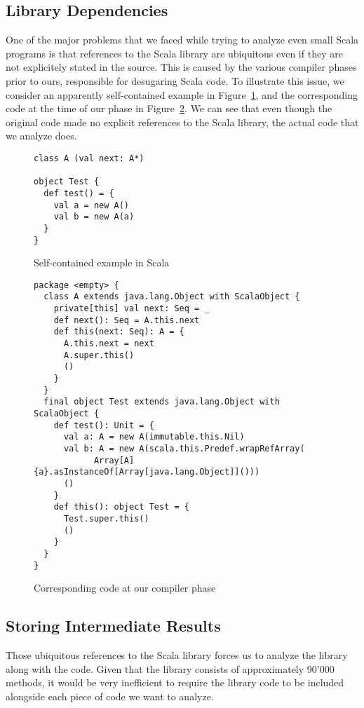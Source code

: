 \subsection{Library Dependencies}
One of the major problems that we faced while trying to analyze even small
Scala programs is that references to the Scala library are ubiquitous even if
they are not explicitely stated in the source. This is caused by the various
compiler phases prior to ours, responsible for desugaring Scala code. To
illustrate this issue, we consider an apparently self-contained example in
Figure~\ref{fig:imp:class}, and the corresponding code at the time of our phase
in Figure~\ref{fig:imp:classlater}. We can see that even though the original
code made no explicit references to the Scala library, the actual code that we
analyze does.
\begin{figure}[h]
    \centering
\begin{lstlisting}
class A (val next: A*)

object Test {
  def test() = {
    val a = new A()
    val b = new A(a)
  }
}
\end{lstlisting}
    \caption{Self-contained example in Scala}
    \label{fig:imp:class}
\end{figure}

\begin{figure}[h]
    \centering
\begin{lstlisting}
package <empty> {
  class A extends java.lang.Object with ScalaObject {
    private[this] val next: Seq = _
    def next(): Seq = A.this.next
    def this(next: Seq): A = {
      A.this.next = next
      A.super.this()
      ()
    }
  }
  final object Test extends java.lang.Object with ScalaObject {
    def test(): Unit = {
      val a: A = new A(immutable.this.Nil)
      val b: A = new A(scala.this.Predef.wrapRefArray(
            Array[A]{a}.asInstanceOf[Array[java.lang.Object]]()))
      ()
    }
    def this(): object Test = {
      Test.super.this()
      ()
    }
  }
}
\end{lstlisting}
    \caption{Corresponding code at our compiler phase}
    \label{fig:imp:classlater}
\end{figure}

\subsection{Storing Intermediate Results}
Those ubiquitous references to the Scala library forces us to analyze the
library along with the code. Given that the library consists of approximately
90'000 methods, it would be very inefficient to require the library code to be
included alongside each piece of code we want to analyze.

